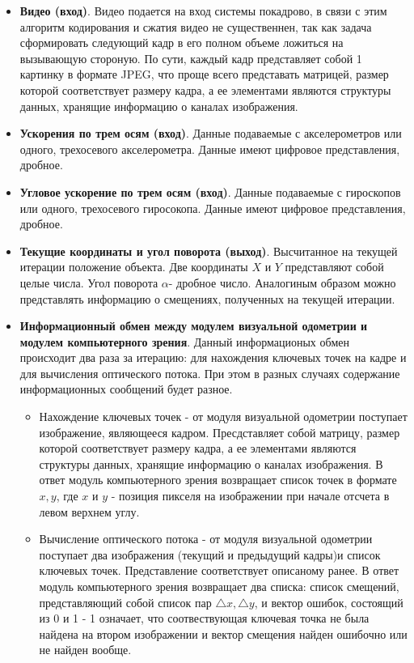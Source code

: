 \begin{itemize}
\item \textbf{Видео (вход)}. Видео подается на вход системы покадрово, в связи с этим алгоритм кодирования и сжатия видео не существеннен, так как задача сформировать следующий кадр в его полном объеме ложиться на вызывающую стороную. По сути, каждый кадр представляет собой 1 картинку в формате JPEG, что проще всего представать матрицей, размер которой соответствует размеру кадра, а ее элементами являются структуры данных, хранящие информацию о каналах изображения. 

\item \textbf{Ускорения по трем осям (вход)}. Данные подаваемые с акселерометров или одного, трехосевого акселерометра. Данные имеют цифровое представления, дробное. 

\item \textbf{Угловое ускорение по трем осям (вход)}. Данные подаваемые с гироскопов или одного, трехосевого гиросокопа. Данные имеют цифровое представления, дробное. 

\item \textbf{Текущие координаты и угол поворота (выход)}. Высчитанное на текущей итерации положение объекта. Две координаты $X$ и $Y$ представляют собой целые числа. Угол поворота  $\alpha$- дробное число. Аналогиным образом можно представлять информацию о смещениях, полученных на текущей итерации. 

\item \textbf{Информационный обмен между модулем визуальной одометрии и модулем компьютерного зрения}. Данный информационых обмен происходит два раза за итерацию: для нахождения ключевых точек на кадре и для вычисления оптического потока. При этом в разных случаях содержание информационных сообщений будет разное.
	\begin{itemize}
	\item Нахождение ключевых точек - от модуля визуальной одометрии поступает изображение, являющееся кадром. Пресдставляет собой матрицу, размер которой соответствует размеру кадра, а ее элементами являются структуры данных, хранящие информацию о каналах изображения. В ответ модуль компьютерного зрения возвращает список точек в формате ${x, y}$, где $x$ и $y$ - позиция пикселя на изображении при начале отсчета в левом верхнем углу. 
	
	\item Вычисление оптического потока - от модуля визуальной одометрии поступает два изображения (текущий и предыдущий кадры)и список ключевых точек. Представление соответствует описаному ранее. В ответ модуль компьютерного зрения возвращает два списка: список смещений, представляющий собой список пар $\triangle x, \triangle y$, и вектор ошибок, состоящий из 0 и 1 - 1 означает, что соотвествующая ключевая точка не была найдена на втором изображении и вектор смещения найден ошибочно или не найден вообще. 
	
	\end{itemize}
\end{itemize}

